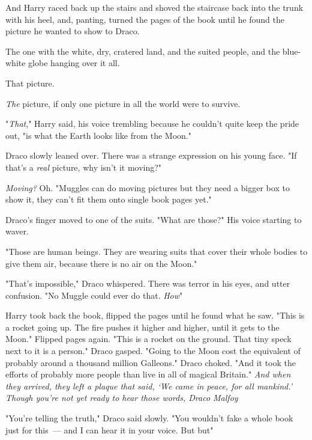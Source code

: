 And Harry raced back up the stairs and shoved the staircase back into the trunk
with his heel, and, panting, turned the pages of the book until he found the
picture he wanted to show to Draco.

The one with the white, dry, cratered land, and the suited people, and the
blue-white globe hanging over it all.

That picture.

\emph{The} picture, if only one picture in all the world were to survive.

"\emph{That}," Harry said, his voice trembling because he couldn't quite keep
the pride out, "is what the Earth looks like from the Moon."

Draco slowly leaned over. There was a strange expression on his young face. "If
that's a \emph{real} picture, why isn't it moving?"

\emph{Moving?} Oh. "Muggles can do moving pictures but they need a bigger box
to show it, they can't fit them onto single book pages yet."

Draco's finger moved to one of the suits. "What are those?" His voice starting
to waver.

"Those are human beings. They are wearing suits that cover their whole bodies
to give them air, because there is no air on the Moon."

"That's impossible," Draco whispered. There was terror in his eyes, and utter
confusion. "No Muggle could ever do that. \emph{How{\el}}"

Harry took back the book, flipped the pages until he found what he saw. "This
is a rocket going up. The fire pushes it higher and higher, until it gets to
the Moon." Flipped pages again. "This is a rocket on the ground. That tiny
speck next to it is a person." Draco gasped. "Going to the Moon cost the
equivalent of{\el} probably around a thousand million Galleons." Draco
choked. "And it took the efforts of{\el} probably more people than live in
all of magical Britain." \emph{And when they arrived, they left a plaque that
said, `We came in peace, for all mankind.' Though you're not yet ready to hear
those words, Draco Malfoy{\el}}

"You're telling the truth," Draco said slowly. "You wouldn't fake a whole book
just for this~--- and I can hear it in your voice. But{\el} but{\el}"

